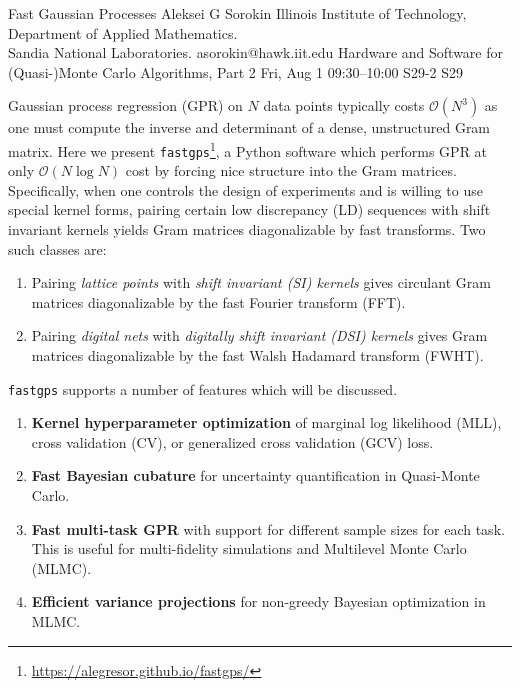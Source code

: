 \begin{talk}
  {Fast Gaussian Processes}%
  {Aleksei G Sorokin}%
  {Illinois Institute of Technology, Department of Applied Mathematics. \\ Sandia National Laboratories.}%
  {asorokin@hawk.iit.edu}%
  {}%
  {Hardware and Software for (Quasi-)Monte Carlo Algorithms, Part 2}%
  {Fri, Aug 1 09:30–10:00}%
  {S29-2}%
  {S29}%
				

        Gaussian process regression (GPR) on $N$ data points typically costs $\mathcal{O}(N^3)$ as one must compute the inverse and determinant of a dense, unstructured Gram matrix. Here we present \texttt{fastgps}\footnote{\url{https://alegresor.github.io/fastgps/}}, a Python software which performs GPR at only $\mathcal{O}(N \log N)$ cost by forcing nice structure into the Gram matrices. Specifically, when one controls the design of experiments and is willing to use special kernel forms, pairing certain low discrepancy (LD) sequences with shift invariant kernels yields Gram matrices diagonalizable by fast transforms. Two such classes are:
        \begin{enumerate}
          \item Pairing \emph{lattice points} with \emph{shift invariant (SI) kernels} gives circulant Gram matrices diagonalizable by the fast Fourier transform (FFT). 
          \item Pairing \emph{digital nets} with \emph{digitally shift invariant (DSI) kernels} gives Gram matrices diagonalizable by the fast Walsh Hadamard transform (FWHT). 
        \end{enumerate}
        \texttt{fastgps} supports a number of features which will be discussed. 
        \begin{enumerate}
          \item \textbf{Kernel hyperparameter optimization} of marginal log likelihood (MLL), cross validation (CV), or generalized cross validation (GCV) loss.
          \item \textbf{Fast Bayesian cubature} for uncertainty quantification in Quasi-Monte Carlo. 
          \item \textbf{Fast multi-task GPR} with support for different sample sizes for each task. This is useful for multi-fidelity simulations and Multilevel Monte Carlo (MLMC). 
          \item \textbf{Efficient variance projections} for non-greedy Bayesian optimization in MLMC.

\end{enumerate}
\end{talk}
